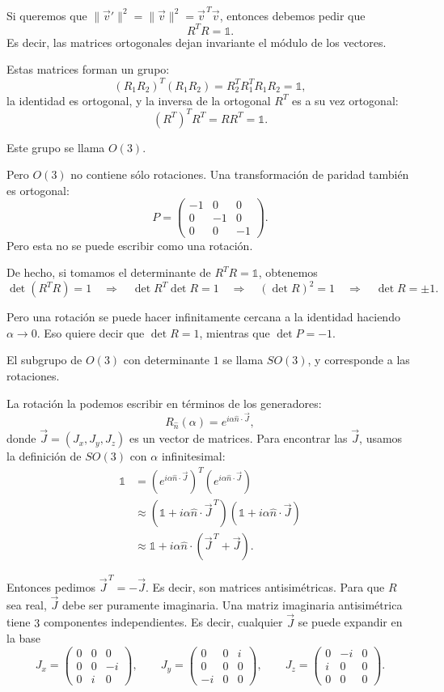 \documentclass[11pt,a4paper]{article}
\begin{document}
Si queremos que $\lVert\vec v'\rVert^2=\lVert\vec v\rVert^2 =\vec v^{\,T}\vec v$, entonces debemos pedir que
\[
  R^TR=\mathbb 1.
\]
Es decir, las matrices ortogonales dejan invariante el módulo de los vectores.

Estas matrices forman un grupo:
\[
  (R_1R_2)^T(R_1R_2)
  =R_2^TR_1^TR_1R_2
  =\mathbb 1,
\]
la identidad es ortogonal, y la inversa de la ortogonal $R^T$ es a su vez ortogonal:
\[
  (R^T)^TR^T=RR^T=\mathbb 1.
\]

Este grupo se llama $O(3)$.

Pero $O(3)$ no contiene sólo rotaciones. Una transformación de paridad también es ortogonal:
\[
  P=
  \begin{pmatrix}
    -1&0&0\\
    0&-1&0\\
    0&0&-1
  \end{pmatrix}.
\]
Pero esta no se puede escribir como una rotación.

De hecho, si tomamos el determinante de $R^TR=\mathbb 1$, obtenemos \[
  \det(R^TR)=1
  \quad\Longrightarrow\quad
  \det R^T\det R=1
  \quad\Longrightarrow\quad
  (\det R)^2=1
  \quad\Longrightarrow\quad
  \det R=\pm1.
\]

Pero una rotación se puede hacer infinitamente cercana a la identidad haciendo $\alpha\to0$. Eso quiere decir que $\det R=1$, mientras que $\det P=-1$.

El subgrupo de $O(3)$ con determinante $1$ se llama $SO(3)$, y corresponde a las rotaciones.

La rotación la podemos escribir en términos de los generadores:
\[
  R_{\hat n}(\alpha)=e^{i\alpha\hat n\cdot\vec J},
\]
donde $\vec J=(J_x,J_y,J_z)$ es un vector de matrices. Para encontrar las $\vec J$, usamos la definición de $SO(3)$ con $\alpha$ infinitesimal:
\begin{align*}
  \mathbb 1
  &=(e^{i\alpha\hat n\cdot\vec J})^T
    (e^{i\alpha\hat n\cdot\vec J})\\
  &\approx(\mathbb 1+i\alpha\hat n\cdot\vec J^{\,T})
    (\mathbb 1+i\alpha\hat n\cdot\vec J)\\
  &\approx\mathbb 1+i\alpha\hat n\cdot
    (\vec J^{\,T}+\vec J).
\end{align*}

Entonces pedimos $\vec J^{\,T}=-\vec J$. Es decir, son matrices antisimétricas. Para que $R$ sea real, $\vec J$ debe ser puramente imaginaria. Una matriz imaginaria antisimétrica tiene $3$ componentes independientes. Es decir, cualquier $\vec J$ se puede expandir en la base
\[
  J_x=
  \begin{pmatrix}
    0&0&0\\
    0&0&-i\\
    0&i&0
  \end{pmatrix},
  \qquad
  J_y=
  \begin{pmatrix}
    0&0&i\\
    0&0&0\\
    -i&0&0
  \end{pmatrix},
  \qquad
  J_z=
  \begin{pmatrix}
    0&-i&0\\
    i&0&0\\
    0&0&0
  \end{pmatrix}.
\]
\end{document}
